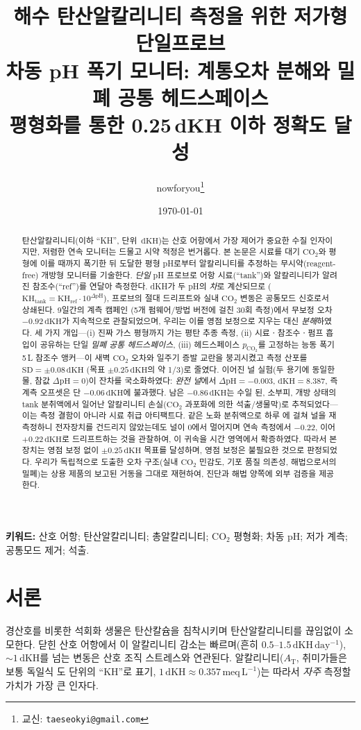 \documentclass[11pt]{article}
\title{\bfseries 해수 탄산알칼리니티 측정을 위한 저가형 단일프로브\\
차동 pH 폭기 모니터: 계통오차 분해와 밀폐 공통 헤드스페이스\\
평형화를 통한 0.25\,dKH 이하 정확도 달성}
\author[1]{nowforyou\thanks{교신: \texttt{taeseokyi@gmail.com}}}
\affil[1]{REEF FAMILY}
\date{\today}
\newcommand{\dpH}{\ensuremath{\Delta\mathrm{pH}}}
\newcommand{\dkh}{\ensuremath{\,\mathrm{dKH}}}
\newcommand{\co}{\ensuremath{\mathrm{CO_2}}}
\newcommand{\pco}{\ensuremath{p_{\mathrm{CO_2}}}}
\newcommand{\at}{\ensuremath{A_\mathrm{T}}}
\begin{document}
\maketitle

\begin{abstract}
\noindent
탄산알칼리니티(이하 ``KH'', 단위 \dkh)는 산호 어항에서 가장 제어가 중요한
수질 인자이지만, 저렴한 연속 모니터는 드물고 시약 적정은 번거롭다. 본 논문은
시료를 대기 \co{}와 평형에 이를 때까지 폭기한 뒤 도달한 평형 pH로부터
알칼리니티를 추정하는 무시약(reagent-free) 개방형 모니터를 기술한다. \emph{단일}
pH 프로브로 어항 시료(``tank'')와 알칼리니티가 알려진 참조수(``ref'')를 연달아
측정한다. dKH가 두 pH의 \emph{차}로 계산되므로
($\mathrm{KH_{tank}} = \mathrm{KH_{ref}}\cdot 10^{\dpH}$), 프로브의 절대
드리프트와 실내 \co{} 변동은 공통모드 신호로서 상쇄된다. 9일간의 계측 캠페인
(5개 펌웨어/방법 버전에 걸친 30회 측정)에서 무보정 오차 $-0.92\dkh$가 지속적으로
관찰되었으며, 우리는 이를 영점 보정으로 지우는 대신 \emph{분해}하였다. 세 가지
개입---(i) 진짜 가스 평형까지 가는 평탄 추종 측정, (ii) 시료ㆍ참조수ㆍ펌프 흡입이
공유하는 단일 \emph{밀폐 공통 헤드스페이스}, (iii) 헤드스페이스 \pco{}를 고정하는
능동 폭기 5\,L 참조수 앵커---이 새벽 \co{} 오차와 일주기 증발 교란을 붕괴시켰고
측정 산포를 $\mathrm{SD}=\pm0.08\dkh$ (목표 $\pm0.25\dkh$의 약 1/3)로 줄였다.
이어진 널 실험(두 용기에 동일한 물, 참값 $\dpH=0$)이 잔차를 국소화하였다:
\emph{완전 널}에서 $\dpH=-0.003$, $\mathrm{dKH}=8.387$, 즉 계측 오프셋은 단
$-0.06\dkh$에 불과했다. 남은 $-0.86\dkh$는 수일 된, 소부피, 개방 상태의 tank
분취액에서 일어난 알칼리니티 손실(\co{} 과포화에 의한  석출/생물막)로
추적되었다---이는 측정 결함이 아니라 시료 취급 아티팩트다. 같은 노화 분취액으로 하루
에 걸쳐 널을 재측정하니 전자장치를 건드리지 않았는데도 널이 0에서 멀어지며 연속 측정에서
$-0.22$, 이어 $+0.22\dkh$로 드리프트하는 것을 관찰하여, 이 귀속을 시간 영역에서 확증하였다. 따라서 본 장치는 영점
보정 없이 $\pm0.25\dkh$ 목표를 달성하며, 영점 보정은 불필요한 것으로 판정되었다.
우리가 독립적으로 도출한 오차 구조(실내 \co{} 민감도, 기포 품질 의존성, 해법으로서의
밀폐)는 상용 제품의 보고된 거동을 그대로 재현하여, 진단과 해법 양쪽에 외부 검증을
제공한다.
\end{abstract}

\noindent\textbf{키워드:} 산호 어항; 탄산알칼리니티; 총알칼리니티; \co{} 평형화;
차동 pH; 저가 계측; 공통모드 제거;  석출.

\section{서론}
경산호를 비롯한 석회화 생물은 탄산칼슘을 침착시키며 탄산알칼리니티를 끊임없이
소모한다. 닫힌 산호 어항에서 이 알칼리니티 감소는 빠르며(흔히
$0.5$--$1.5\dkh\,\mathrm{day^{-1}}$), $\sim1\dkh$를 넘는 변동은 산호 조직 스트레스와
연관된다. 알칼리니티(\at{}, 취미가들은 보통 독일식 도 단위의 ``KH''로 표기,
$1\dkh \approx 0.357\,\mathrm{meq\,L^{-1}}$)는 따라서 \emph{자주} 측정할 가치가
가장 큰 인자다.
\end{document}
